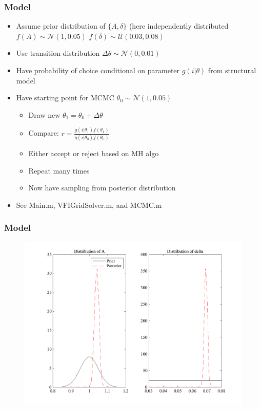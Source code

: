 \documentclass{beamer}
\begin{document}
\begin{frame}
\frametitle[alignment=center]{Model}
\begin{itemize}
\item Assume prior distribution of $\{A,\delta\}$ (here independently distributed $f(A)\sim\mathcal{N}(1,0.05)$ $f(\delta)\sim\mathcal{U}(0.03,0.08)$
\item Use transition distribution $\Delta\theta\sim\mathcal{N}(0,0.01)$
\item Have probability of choice conditional on parameter $g(i|\theta)$  from structural model
\item Have starting point for MCMC $\theta_0\sim\mathcal{N}(1,0.05) $
\begin{itemize}
\item Draw new $\theta_1=\theta_0+\Delta\theta$
\item Compare: $r=\frac{g(i|\theta_1)f(\theta_1)}{g(i|\theta_0)f(\theta_0)}$
\item Either accept or reject based on MH algo
\item Repeat many times
\item Now have sampling from posterior distribution
\end{itemize}
\item See Main.m, VFIGridSolver.m, and MCMC.m
\end{itemize}
\end{frame}

\begin{frame}
\frametitle[alignment=center]{Model}
\begin{figure}
\centering
\includegraphics[scale=0.3]{MCMC_Example_VFI.png}
\end{figure}
\end{frame}
\end{document}
